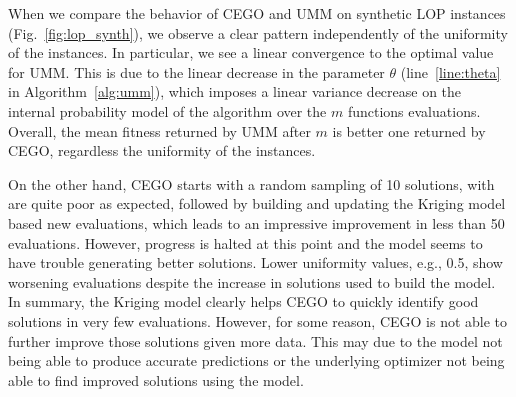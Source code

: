 \documentclass[runningheads]{llncs}
\newcommand{\FEmax}{\ensuremath{m}}
\begin{document}
When we compare the behavior of CEGO and
UMM on synthetic LOP instances (Fig.~\ref{fig:lop_synth}), we observe a clear
pattern independently of the uniformity of the instances. In particular, we see
a linear convergence to the optimal value for UMM.  This is due to the linear
decrease in the parameter $\theta$ (line~\ref{line:theta} in
Algorithm~\ref{alg:umm}), which imposes a linear variance decrease on the
internal probability model of the algorithm over the $\FEmax$ functions
evaluations. Overall, the mean fitness returned by UMM after $\FEmax$ is better one returned by  CEGO, regardless the uniformity of the instances.





On the other hand, %
CEGO starts with a random sampling
of 10 solutions, with are quite poor as expected, followed by building and
updating the Kriging model based new evaluations, which leads to an impressive
improvement in less than 50 evaluations. However, progress is %
halted at this point and the model seems to have trouble generating better
solutions. Lower uniformity values, e.g., 0.5,
 show worsening evaluations
despite the increase in solutions used to build the model. In summary, the
Kriging model clearly helps CEGO to quickly identify good solutions in very few
evaluations. However, for some reason, CEGO is not able to further improve
those solutions given more data. This may due to the model not being able to
produce accurate predictions or the underlying optimizer not being able to find
improved solutions using the model.
\end{document}

